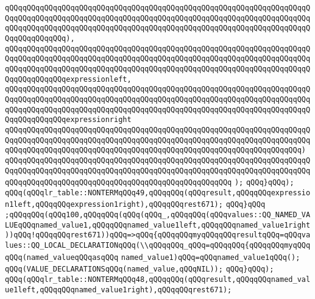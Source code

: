\verb|qQQqqQQqqQQqqQQqqQQqqQQqqQQqqQQqqQQqqQQqqQQqqQQqqQQqqQQqqQQqqQQqqQQqqQQqqQQqqQQqqQQqqQQqqQQqqQQqqQQqqQQqqQQqqQQqqQQqqQQqqQQqqQQqqQQqqQQqqQQqqQQqqQQqqQQqqQQqqQQqqQQqqQQqqQQqqQQqqQQqqQQqqQQqqQQqqQQqqQQqqQQqqQQqqQQqqQQqqQQqqQQq),|\newline
\verb|qQQqqQQqqQQqqQQqqQQqqQQqqQQqqQQqqQQqqQQqqQQqqQQqqQQqqQQqqQQqqQQqqQQqqQQqqQQqqQQqqQQqqQQqqQQqqQQqqQQqqQQqqQQqqQQqqQQqqQQqqQQqqQQqqQQqqQQqqQQqqQQqqQQqqQQqqQQqqQQqqQQqqQQqqQQqqQQqqQQqqQQqqQQqqQQqqQQqqQQqqQQqqQQqqQQqqQQqqQQqqQQqexpressionleft,|\newline
\verb|qQQqqQQqqQQqqQQqqQQqqQQqqQQqqQQqqQQqqQQqqQQqqQQqqQQqqQQqqQQqqQQqqQQqqQQqqQQqqQQqqQQqqQQqqQQqqQQqqQQqqQQqqQQqqQQqqQQqqQQqqQQqqQQqqQQqqQQqqQQqqQQqqQQqqQQqqQQqqQQqqQQqqQQqqQQqqQQqqQQqqQQqqQQqqQQqqQQqqQQqqQQqqQQqqQQqqQQqqQQqqQQqexpressionright|\newline
\verb|qQQqqQQqqQQqqQQqqQQqqQQqqQQqqQQqqQQqqQQqqQQqqQQqqQQqqQQqqQQqqQQqqQQqqQQqqQQqqQQqqQQqqQQqqQQqqQQqqQQqqQQqqQQqqQQqqQQqqQQqqQQqqQQqqQQqqQQqqQQqqQQqqQQqqQQqqQQqqQQqqQQqqQQqqQQqqQQqqQQqqQQqqQQqqQQqqQQqqQQqqQQqqQQq)|\newline
\verb|qQQqqQQqqQQqqQQqqQQqqQQqqQQqqQQqqQQqqQQqqQQqqQQqqQQqqQQqqQQqqQQqqQQqqQQqqQQqqQQqqQQqqQQqqQQqqQQqqQQqqQQqqQQqqQQqqQQqqQQqqQQqqQQqqQQqqQQqqQQqqQQqqQQqqQQqqQQqqQQqqQQqqQQqqQQqqQQqqQQqqQQqqQQqqQQq|\newline
\verb|);|\newline
\verb|qQQq}qQQq);|\newline
\verb|qQQq(qQQqlr_table::NONTERMqQQq49,qQQqqQQq(qQQqresult,qQQqqQQqexpression1left,qQQqqQQqexpression1right),qQQqqQQqrest671);|\newline
\verb|qQQq}qQQq|\newline
\verb|;qQQqqQQq(qQQq100,qQQqqQQq(qQQq(qQQq_,qQQqqQQq(qQQqvalues::QQ_NAMED_VALUEqQQqnamed_value1,qQQqqQQqnamed_value1left,qQQqqQQqnamed_value1right))qQQq!qQQqqQQqrest671))qQQq=>qQQq{qQQqqQQqmyqQQqqQQqresultqQQq=qQQqvalues::QQ_LOCAL_DECLARATIONqQQq(\\qQQqqQQq_qQQq=qQQqqQQq{qQQqqQQqmyqQQqqQQq(named_valueqQQqasqQQq|\newline
\verb|named_value1)qQQq=qQQqnamed_value1qQQq();|\newline
\verb|qQQq(VALUE_DECLARATIONSqQQq(named_value,qQQqNIL));|\newline
\verb|qQQq}qQQq);|\newline
\verb|qQQq(qQQqlr_table::NONTERMqQQq48,qQQqqQQq(qQQqresult,qQQqqQQqnamed_value1left,qQQqqQQqnamed_value1right),qQQqqQQqrest671);|\newline
